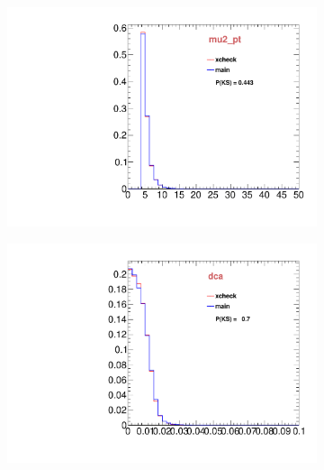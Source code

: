 \begin{figure}
\begin{subfigure}[b]{0.2\textwidth}
                \includegraphics[width=\textwidth]{Figures/VariablesComparison/Data_endcaps_figs/m2pt}
                \label{fig:Data_endcaps_m2pt}
        \end{subfigure}
        \begin{subfigure}[b]{0.2\textwidth}
                \centering
                \includegraphics[width=\textwidth]{Figures/VariablesComparison/Data_endcaps_figs/maxdoca}
                \label{fig:Data_endcaps_maxdoca}
        \end{subfigure}
        \begin{subfigure}[b]{0.2\textwidth}
                \centering

\end{subfigure}
\end{figure}
